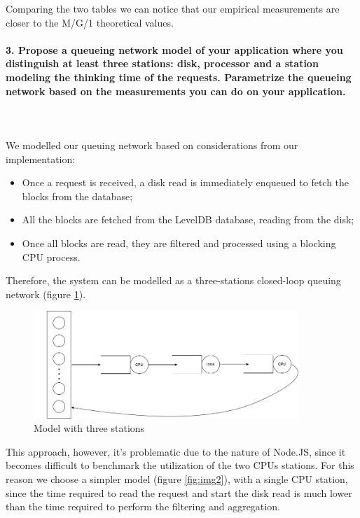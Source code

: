 \documentclass[11pt]{scrartcl} %
\begin{document}
Comparing the two tables we can notice that our empirical measurements are closer to the M/G/1 theoretical values. 


\paragraph*{3. Propose a queueing network model of your application where you distinguish at least three stations: disk, processor and a station modeling the thinking time of the requests. Parametrize the queueing network based on the measurements you can do on your application.} \mbox{}\\\\

We modelled our queuing network based on considerations from our implementation:

\begin{itemize}
\item[\adforn{43}] Once a request is received, a disk read is immediately enqueued to fetch the blocks from the database;
\item[\adforn{43}] All the blocks are fetched from the LevelDB database, reading from the disk;
\item[\adforn{43}] Once all blocks are read, they are filtered and processed using a blocking CPU process.
\end{itemize}

Therefore, the system can be modelled as a three-stations closed-loop queuing network (figure \ref{fig:img1}).

\begin{figure}[h]
\includegraphics[width=10cm]{Images/img1.png}
\centering
\caption{Model with three stations}
\label{fig:img1}
\end{figure}

This approach, however, it's problematic due to the nature of Node.JS, since it becomes difficult to benchmark the utilization of the two CPUs stations. For this reason we choose a simpler model (figure \ref{fig:img2}), with a single CPU station, since the time required to read the request and start the disk read is much lower than the time required to perform the filtering and aggregation.
\end{document}
